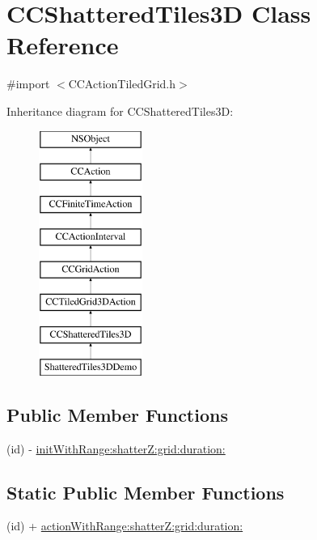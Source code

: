 \hypertarget{interface_c_c_shattered_tiles3_d}{\section{C\-C\-Shattered\-Tiles3\-D Class Reference}
\label{interface_c_c_shattered_tiles3_d}
}


{\ttfamily \#import $<$C\-C\-Action\-Tiled\-Grid.\-h$>$}

Inheritance diagram for C\-C\-Shattered\-Tiles3\-D\-:\begin{figure}[H]
\begin{center}
\leavevmode
\includegraphics[height=8.000000cm]{interface_c_c_shattered_tiles3_d}
\end{center}
\end{figure}
\subsection*{Public Member Functions}
\begin{DoxyCompactItemize}
\item 
(id) -\/ \hyperlink{interface_c_c_shattered_tiles3_d_a62f6a2137bbb3f0e691aa398177edfcc}{init\-With\-Range\-:shatter\-Z\-:grid\-:duration\-:}
\end{DoxyCompactItemize}
\subsection*{Static Public Member Functions}
\begin{DoxyCompactItemize}
\item 
(id) + \hyperlink{interface_c_c_shattered_tiles3_d_ac80a1129b5738fb44dc870d53cd9a562}{action\-With\-Range\-:shatter\-Z\-:grid\-:duration\-:}
\end{DoxyCompactItemize}
